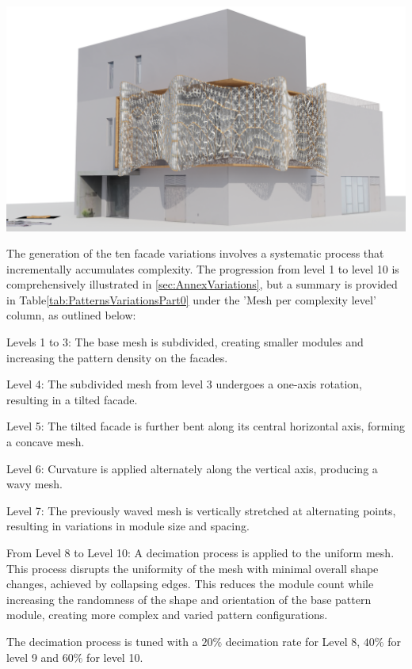 \begin{table}[!htb]
\begin{tabularx}
              {\includegraphics[width=1\linewidth]{Images/Pattern 3/0009}} \\
            \bottomrule
        \end{tabularx}
    \end{table}

The generation of the ten facade variations involves a systematic process that incrementally accumulates complexity.
The progression from level 1 to level 10 is comprehensively illustrated in \ref{sec:AnnexVariations}, but a summary is provided in Table\ref{tab:PatternsVariationsPart0} under the 'Mesh per complexity level' column, as outlined below:

Levels 1 to 3: The base mesh is subdivided, creating smaller modules and increasing the pattern density on the facades.

Level 4: The subdivided mesh from level 3 undergoes a one-axis rotation, resulting in a tilted facade.

Level 5: The tilted facade is further bent along its central horizontal axis, forming a concave mesh.

Level 6: Curvature is applied alternately along the vertical axis, producing a wavy mesh.

Level 7: The previously waved mesh is vertically stretched at alternating points, resulting in variations in module size and spacing.

From Level 8 to Level 10: A decimation process is applied to the uniform mesh.
This process disrupts the uniformity of the mesh with minimal overall shape changes\cite{Blender2023}, achieved by collapsing edges.
This reduces the module count while increasing the randomness of the shape and orientation of the base pattern module, creating more complex and varied pattern configurations.

The decimation process is tuned with a \(20\%\) decimation rate for Level 8, \(40\%\) for level 9 and \(60\%\) for level 10.

